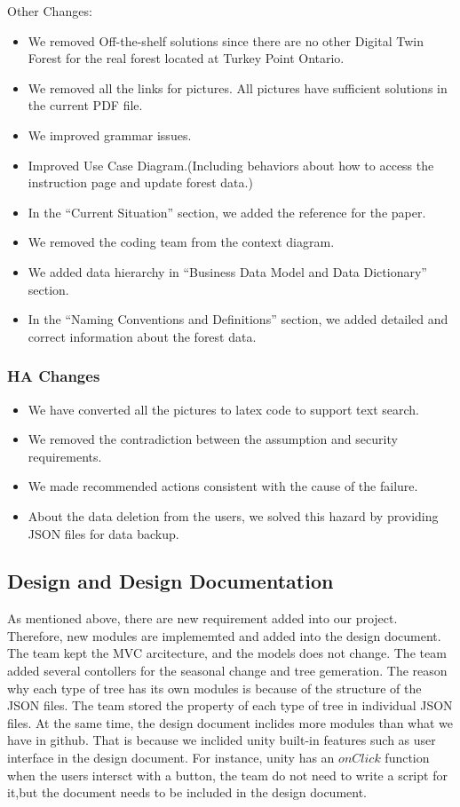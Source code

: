 \documentclass{article}
\begin{document}
\noindent
Other Changes:
\begin{itemize}
\item We removed Off-the-shelf solutions since there are no other 
Digital Twin Forest for the real forest located at Turkey Point Ontario.
\item We removed all the links for pictures. All pictures have sufficient 
solutions in the current PDF file.
\item We improved grammar issues.
\item Improved Use Case Diagram.(Including behaviors about how to access 
the instruction page and update forest data.) 
\item In the ``Current Situation'' section, we added the reference for the paper.
\item We removed the coding team from the context diagram.
\item We added data hierarchy in ``Business Data Model and Data Dictionary''
section.
\item In the ``Naming Conventions and Definitions'' section, we added detailed
and correct information about the forest data. 
\end{itemize}

\subsubsection{HA Changes}
\begin{itemize}
\item We have converted all the pictures to latex code to support text search.
\item We removed the contradiction between the assumption and security 
requirements.
\item We made recommended actions consistent with the cause of the failure.
\item About the data deletion from the users, we solved this 
hazard by providing JSON files for data backup.
\end{itemize}


\subsection{Design and Design Documentation}
As mentioned above, there are new requirement added into our project. Therefore, new modules are implememted and added into the design document. The team kept the MVC arcitecture, and the models does not change. The team added several contollers for the seasonal change and tree gemeration. The reason why each type of tree has its own modules is because of the structure of the JSON files. The team stored the property of each type of tree in individual JSON files. At the same time, the design document inclides more modules than what we have in github. That is because we inclided unity built-in features such as user interface in the design document. For instance, unity has an $onClick$ function when the users intersct with a button, the team do not need to write a script for it,but the document needs to be included in the design document.
\end{document}
